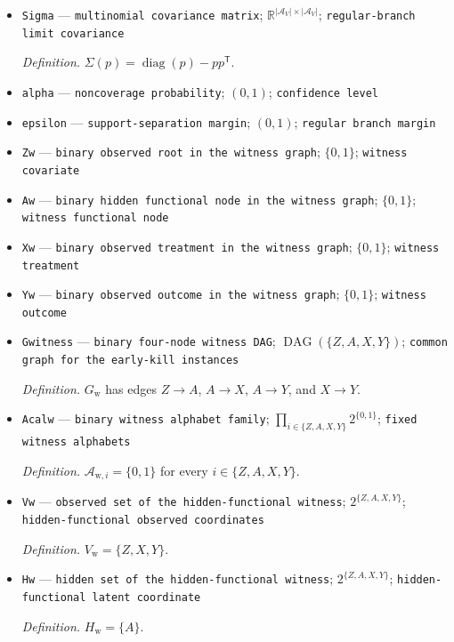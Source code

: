 \documentclass{article}
\begin{document}
\begin{itemize}
  \item \texttt{Sigma} --- \texttt{multinomial covariance matrix}; \(\mathbb R^{|\mathcal A_V|\times|\mathcal A_V|}\); \texttt{regular-\allowbreak{}branch limit covariance}
  \par\smallskip\noindent\emph{Definition.} \(\Sigma(p)=\operatorname{diag}(p)-pp^{\mathsf T}\).
  \item \texttt{alpha} --- \texttt{noncoverage probability}; \((0,1)\); \texttt{confidence level}
  \item \texttt{epsilon} --- \texttt{support-\allowbreak{}separation margin}; \((0,1)\); \texttt{regular branch margin}
  \item \texttt{Zw} --- \texttt{binary observed root in the witness graph}; \(\{0,1\}\); \texttt{witness covariate}
  \item \texttt{Aw} --- \texttt{binary hidden functional node in the witness graph}; \(\{0,1\}\); \texttt{witness functional node}
  \item \texttt{Xw} --- \texttt{binary observed treatment in the witness graph}; \(\{0,1\}\); \texttt{witness treatment}
  \item \texttt{Yw} --- \texttt{binary observed outcome in the witness graph}; \(\{0,1\}\); \texttt{witness outcome}
  \item \texttt{Gwitness} --- \texttt{binary four-\allowbreak{}node witness DAG}; \(\operatorname{DAG}(\{Z,A,X,Y\})\); \texttt{common graph for the early-\allowbreak{}kill instances}
  \par\smallskip\noindent\emph{Definition.} \(G_{\mathrm w}\) has edges \(Z\to A\), \(A\to X\), \(A\to Y\), and \(X\to Y\).
  \item \texttt{Acalw} --- \texttt{binary witness alphabet family}; \(\prod_{i\in\{Z,A,X,Y\}}2^{\{0,1\}}\); \texttt{fixed witness alphabets}
  \par\smallskip\noindent\emph{Definition.} \(\mathcal A_{\mathrm w,i}=\{0,1\}\) for every \(i\in\{Z,A,X,Y\}\).
  \item \texttt{Vw} --- \texttt{observed set of the hidden-\allowbreak{}functional witness}; \(2^{\{Z,A,X,Y\}}\); \texttt{hidden-\allowbreak{}functional observed coordinates}
  \par\smallskip\noindent\emph{Definition.} \(V_{\mathrm w}=\{Z,X,Y\}\).
  \item \texttt{Hw} --- \texttt{hidden set of the hidden-\allowbreak{}functional witness}; \(2^{\{Z,A,X,Y\}}\); \texttt{hidden-\allowbreak{}functional latent coordinate}
  \par\smallskip\noindent\emph{Definition.} \(H_{\mathrm w}=\{A\}\).

\end{itemize}
\end{document}
